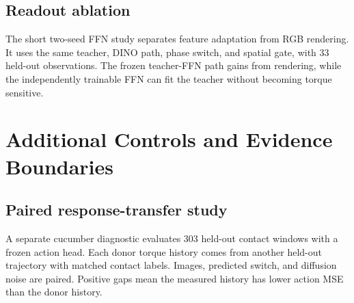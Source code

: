 \documentclass[10pt,twocolumn,letterpaper]{article}
\begin{document}
\subsection{Readout ablation}
The short two-seed FFN study separates feature adaptation from RGB rendering.
It uses the same teacher, DINO path, phase switch, and spatial gate, with 33
held-out observations. The frozen teacher-FFN path gains from rendering, while
the independently trainable FFN can fit the teacher without becoming torque
sensitive.

\begin{table}[t]
\centering
\caption{Two-seed readout ablation. Values are mean $\pm$ population standard
deviation across the two seeds.}
\label{tab:ffn}
\setlength{\tabcolsep}{2.4pt}
\end{table}

\section{Additional Controls and Evidence Boundaries}
\label{sec:limits}

\subsection{Paired response-transfer study}
A separate cucumber diagnostic evaluates 303 held-out contact windows with a
frozen action head. Each donor torque history comes from another held-out
trajectory with matched contact labels. Images, predicted switch, and diffusion
noise are paired. Positive gaps mean the measured history has lower action MSE
than the donor history.
\end{document}
